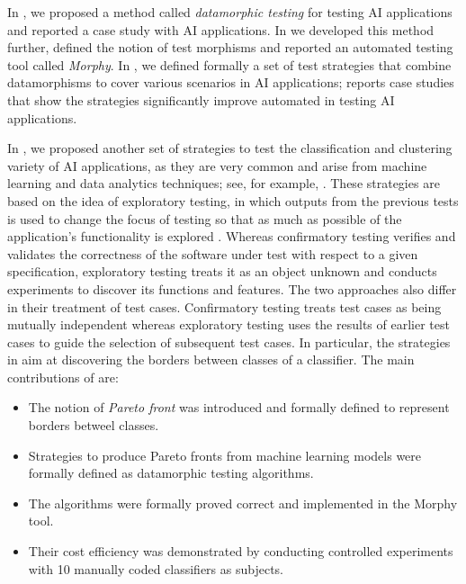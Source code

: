 \documentclass[preprint,1p,authoryear,times]{elsarticle}
\begin{document}
In \citep{DatamorphicTR2019, Datamorphic2019}, we proposed a method called \emph{datamorphic testing} for testing AI applications and reported a case study with AI applications. In \citep{AITest2020TR, AITest2020} we developed this method further, defined the notion of test morphisms and reported an automated testing tool called \emph{Morphy}. In \citep{AITest2020}, we defined formally a set of test strategies that combine datamorphisms to cover various scenarios in AI applications; \citep{AITest2020TR} reports case studies that show the strategies significantly improve automated in testing AI applications. 

In \citep{AST2020}, we proposed another set of strategies to test the classification and clustering variety of AI applications, as they are very common and arise from machine learning and data analytics techniques; see, for example, \citep{DataMiningTextBook,FoundationsOfMLBook,UnderstandingMLBook}. These strategies are based on the idea of exploratory testing, in which outputs from the previous tests is used to change the focus of testing so that as much as possible of the application's functionality is explored \citep{whittaker2009exploratory}. Whereas confirmatory testing verifies and validates the correctness of the software under test with respect to a given specification, exploratory testing treats it as an object unknown and conducts experiments to discover its functions and features. The two approaches also differ in their treatment of test cases. Confirmatory testing treats test cases as being mutually independent whereas exploratory testing uses the results of earlier test cases to guide the selection of subsequent test cases. In particular, the strategies in \citep{AST2020} aim at discovering the borders between classes of a classifier. The main contributions of \citep{AST2020} are:

\begin{itemize}
\item The notion of \emph{Pareto front} was introduced and formally defined to represent borders betweel classes.
\item Strategies to produce Pareto fronts from machine learning models were formally defined as datamorphic testing algorithms. 
\item The algorithms were formally proved correct and implemented in the Morphy tool.
\item Their cost efficiency was demonstrated by conducting controlled experiments with 10 manually coded classifiers as subjects.
\end{itemize}
\end{document}
